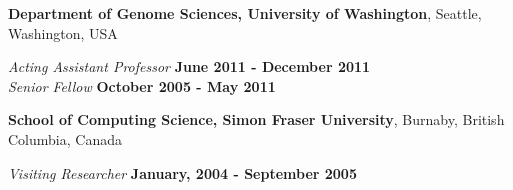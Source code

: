 \documentclass[margin,line]{res}
\newcommand{\junk}[1]{}
\begin{document}
\begin{resume}
                 {\bf Department of Genome Sciences, University of Washington},
                         Seattle, Washington, USA
                         
                         \vspace{-.3cm}
                                {\em Acting Assistant Professor} \hfill {\bf June 2011 - December 2011} \\                           %
                                      {\em Senior Fellow} \hfill {\bf October 2005 - May 2011}
                                       
                          {\bf School of Computing Science, Simon Fraser University},
                          Burnaby, British Columbia, Canada

                          \vspace{-.3cm}
                                         {\em Visiting Researcher} \hfill {\bf January, 2004 - September 2005}\\
                                         \junk{
                                         Worked on RNA-RNA interaction algorithms, and RNA secondary structure
                                         motif discovery problems, collaborating with Peter Unrau, Kaizhong
                                         Zhang, and Jeremy Buhler.
                                         }
                                       
                                       
                                       
                                       \junk{
                                         {\bf Department of EECS, Case Western Reserve University},
                                         Cleveland, Ohio, USA
                                         
                                         \vspace{-.2cm}
                                                {\em Research \& Teaching Assistant} \hfill {\bf August 2000 - December 2003}\\
                                                Worked on phylogenetic tree algorithms, sequence analysis, and RNA-RNA
                                                interaction algorithms, collaborating with Evan E. Eichler and Joe
                                                Nadeau.                                                 
                                                
}
\end{resume}
\end{document}
